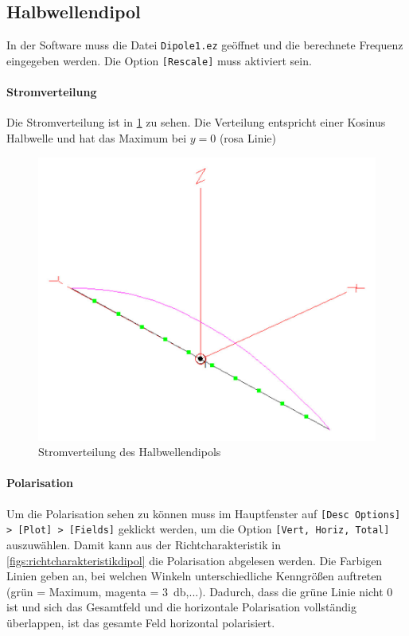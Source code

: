 \documentclass[colorlinks = true, allcolors = black, ngerman, 11pt,
a4paper, twoside, titlepage]{article}
\numberwithin{figure}{section}
\renewcommand{\si}[2]{\SI{#1}{#2}}
\begin{document}
	\subsection{Halbwellendipol}
	In der Software muss die Datei \texttt{Dipole1.ez} geöffnet und die berechnete Frequenz eingegeben werden. Die Option \texttt{[Rescale]} muss aktiviert sein.
	
	\paragraph{Stromverteilung} Die Stromverteilung ist in \cref{fig:dipolantennaview} zu sehen. Die Verteilung entspricht einer Kosinus Halbwelle und hat das Maximum bei $y=0$ (rosa Linie)
	\begin{figure}[h]
		\centering
		\includegraphics[width=0.7\linewidth]{imgs/dipol_antenna_view}
		\caption{Stromverteilung des Halbwellendipols}
		\label{fig:dipolantennaview}
	\end{figure}
	
	\paragraph{Polarisation}
	Um die Polarisation sehen zu können muss im Hauptfenster auf \texttt{[Desc Options] > [Plot] > [Fields]} geklickt werden, um die Option \texttt{[Vert, Horiz, Total]} auszuwählen. Damit kann aus der Richtcharakteristik in \cref{figs:richtcharakteristikdipol} die Polarisation abgelesen werden. Die Farbigen Linien geben an, bei welchen Winkeln unterschiedliche Kenngrößen auftreten (grün = Maximum, magenta = \si{3}{\decibel},...). Dadurch, dass die grüne Linie nicht $0$ ist und sich das Gesamtfeld und die horizontale Polarisation vollständig überlappen, ist das gesamte Feld horizontal polarisiert.
	
\end{document}
